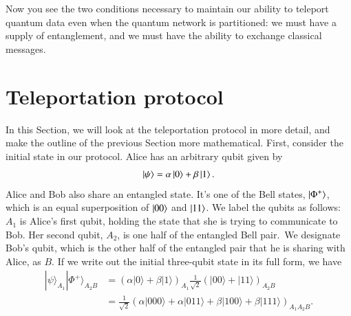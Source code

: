 Now you see the two conditions necessary to maintain our ability to teleport quantum data even when the quantum network is partitioned: we must have a supply of entanglement, and we must have the ability to exchange classical messages.



\section{Teleportation protocol}
\label{sec:8-2_teleportation_protocol}

In this Section, we will look at the teleportation protocol in more detail, and make the outline of the previous Section more mathematical.
First, consider the initial state in our protocol.
Alice has an arbitrary qubit given by
\begin{align}
    \left| \psi \right\rangle = \alpha\left| 0 \right\rangle + \beta\left| 1 \right\rangle.
\end{align}
Alice and Bob also share an entangled state.
It's one of the Bell states, $\left| \Phi^+ \right\rangle$, which is an equal superposition of $\left| 00 \right\rangle$ and $\left| 11 \right\rangle$.
We label the qubits as follows: $A_1$ is Alice's first qubit, holding the state that she is trying to communicate to Bob. 
Her second qubit, $A_2$, is one half of the entangled Bell pair.\
We designate Bob's qubit, which is the other half of the entangled pair that he is sharing with Alice, as $B$.
If we write out the initial three-qubit state in its full form, we have
\begin{align}
    |\psi\rangle_{A_{1}}|\Phi^{+}\rangle_{A_{2} B} &=(\alpha|0\rangle+\beta|1\rangle)_{A_{1}} \frac{1}{\sqrt{2}}(|00\rangle+|11\rangle)_{A_{2} B} \nonumber\\
    &=\frac{1}{\sqrt{2}}(\alpha|000\rangle+\alpha|011\rangle+\beta|100\rangle+\beta|111\rangle)_{A_{1} A_{2} B}.
    \label{eq:teleportation_initial_state}
\end{align}

